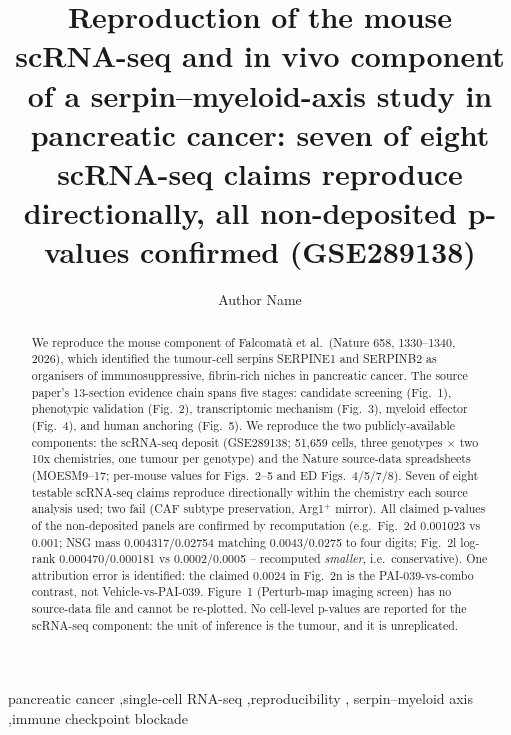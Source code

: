 \documentclass[preprint,12pt]{elsarticle}
\begin{document}
\begin{frontmatter}

\title{Reproduction of the mouse scRNA-seq and in vivo component of a
serpin--myeloid-axis study in pancreatic cancer: seven of eight
scRNA-seq claims reproduce directionally, all non-deposited
p-values confirmed (GSE289138)}

\author[a]{Author Name}

\begin{abstract}
We reproduce the mouse component of Falcomat\`a et al.\ (Nature 658,
1330--1340, 2026), which identified the tumour-cell serpins SERPINE1 and
SERPINB2 as organisers of immunosuppressive, fibrin-rich niches in
pancreatic cancer. The source paper's 13-section evidence chain spans
five stages: candidate screening (Fig.~1), phenotypic validation
(Fig.~2), transcriptomic mechanism (Fig.~3), myeloid effector
(Fig.~4), and human anchoring (Fig.~5). We reproduce the two
publicly-available components: the scRNA-seq deposit (GSE289138;
51{,}659 cells, three genotypes $\times$ two 10x chemistries, one
tumour per genotype) and the Nature source-data spreadsheets
(MOESM9--17; per-mouse values for Figs.~2--5 and ED Figs.~4/5/7/8).
Seven of eight testable scRNA-seq claims reproduce directionally
within the chemistry each source analysis used; two fail (CAF subtype
preservation, Arg1$^{+}$ mirror). All claimed p-values of the
non-deposited panels are confirmed by recomputation (e.g.\ Fig.~2d
0.001023 vs 0.001; NSG mass 0.004317/0.02754 matching 0.0043/0.0275
to four digits; Fig.~2l log-rank 0.000470/0.000181 vs 0.0002/0.0005
-- recomputed \emph{smaller}, i.e.\ conservative). One attribution
error is identified: the claimed 0.0024 in Fig.~2n is the
PAI-039-vs-combo contrast, not Vehicle-vs-PAI-039. Figure~1
(Perturb-map imaging screen) has no source-data file and cannot be
re-plotted. No cell-level p-values are reported for the scRNA-seq
component: the unit of inference is the tumour, and it is unreplicated.
\end{abstract}

\begin{keyword}
pancreatic cancer \sep single-cell RNA-seq \sep reproducibility \sep
serpin--myeloid axis \sep immune checkpoint blockade
\end{keyword}

\end{frontmatter}

\end{document}
